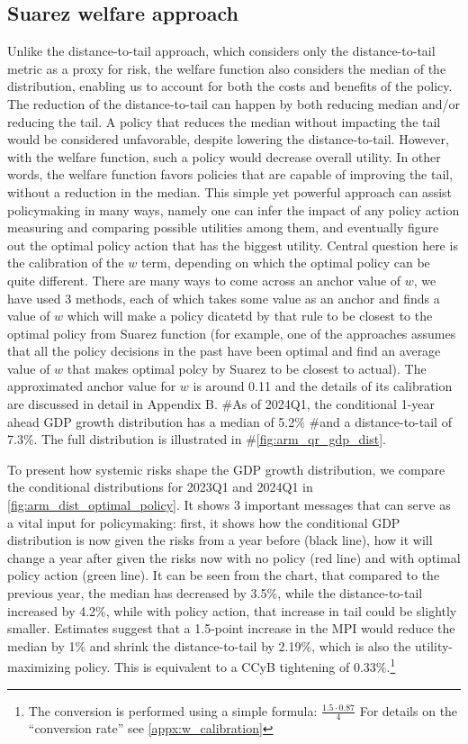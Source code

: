 \subsection{Suarez welfare approach}
Unlike the distance-to-tail approach, which considers only the distance-to-tail metric as a proxy for risk, the \citet{suarez2022} welfare function also considers the median of the distribution, enabling us to account for both the costs and benefits of the policy. The reduction of the distance-to-tail can happen by both reducing median and/or reducing the tail. A policy that reduces the median without impacting the tail would be considered unfavorable, despite lowering the distance-to-tail. However, with the welfare function, such a policy would decrease overall utility. In other words, the welfare function favors policies that are capable of improving the tail, without a reduction in the median. 
This simple yet powerful approach can assist policymaking in many ways, namely one can infer the impact of any policy action measuring and comparing possible utilities among them, and eventually figure out the optimal policy action that has the biggest utility. Central question here is the calibration of the $w$ term, depending on which the optimal policy can be quite different. There are many ways to come across an anchor value of $w$, we have used 3 methods, each of which takes some value as an anchor and finds a value of $w$  which will make a policy dicatetd by that rule to be closest to the optimal policy from Suarez function (for example, one of the approaches assumes that all the policy decisions in the past have been optimal and find an average value of $w$ that makes optimal polcy by Suarez to be closest to actual). The approximated anchor value for $w$  is around 0.11 and the details of its calibration are discussed in detail in Appendix B. 
#As of 2024Q1, the conditional 1-year ahead GDP growth distribution has a median of 5.2\% #and a distance-to-tail of 7.3\%. The full distribution is illustrated in #\autoref{fig:arm_qr_gdp_dist}.

To present how systemic risks shape the GDP growth distribution, we compare the conditional distributions for 2023Q1 and 2024Q1 in \autoref{fig:arm_dist_optimal_policy}. It shows 3 important messages that can serve as a vital input for policymaking: first, it shows how the conditional GDP distribution is now given the risks from a year before (black line), how it will change a year after given the risks now with no policy (red line) and with optimal policy action (green line). It can be seen from the chart, that compared to the previous year, the median has decreased by 3.5\%, while the distance-to-tail increased by 4.2\%, while with policy action, that increase in tail could be slightly smaller. Estimates suggest that a 1.5-point increase in the MPI would reduce the median by 1\% and shrink the distance-to-tail by 2.19\%, which is also the utility-maximizing policy. This is equivalent to a CCyB tightening of 0.33\%.\footnote{The conversion is performed using a simple formula: $\frac{1.5 \cdot 0.87}{4}$ For details on the ``conversion rate'' see \ref{appx:w_calibration}}


